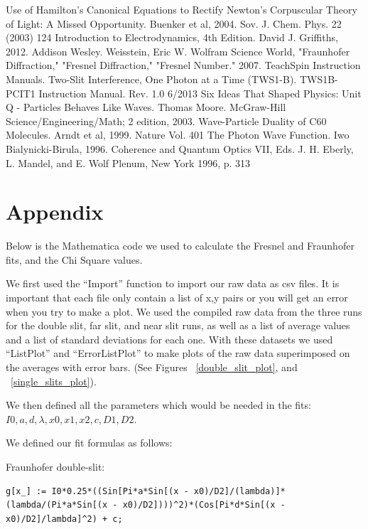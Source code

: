 \documentclass[prb,preprint]{revtex4-1}
\begin{document}
\begin{thebibliography}{3}
 Use of Hamilton's Canonical Equations to Rectify Newton's Corpuscular Theory of Light:  A Missed Opportunity.  Buenker et al, 2004.  Sov. J. Chem. Phys. 22 (2003) 124
 Introduction to Electrodynamics, 4th Edition.  David J. Griffiths, 2012.  Addison Wesley.
Weisstein, Eric W. Wolfram Science World, "Fraunhofer Diffraction," "Fresnel Diffraction," "Fresnel Number." 2007. 
 TeachSpin Instruction Manuals.  Two-Slit Interference, One Photon at a Time (TWS1-B).  TWS1B-PCIT1 Instruction Manual. Rev. 1.0 6/2013
 Six Ideas That Shaped Physics: Unit Q - Particles Behaves Like Waves.  Thomas Moore.  McGraw-Hill Science/Engineering/Math; 2 edition, 2003.
 Wave-Particle Duality of C60 Molecules.  Arndt et al, 1999.  Nature Vol. 401
The Photon Wave Function.  Iwo Bialynicki-Birula, 1996.  Coherence and Quantum Optics VII, Eds. J. H. Eberly, L. Mandel, and E. Wolf
Plenum, New York 1996, p. 313
\end{thebibliography}

\section{Appendix}
Below is the Mathematica code we used to calculate the Fresnel and Fraunhofer fits, and the Chi Square values.  

We first used the ``Import'' function to import our raw data as csv files. It is important that each file only contain a list of x,y pairs or you will get an error when you try to make a plot. We used the compiled raw data from the three runs for the double slit, far slit, and near slit runs, as well as a list of average values and a list of standard deviations for each one. With these datasets we used ``ListPlot'' and ``ErrorListPlot'' to make plots of the raw data superimposed on the averages with error bars.  (See Figures ~\ref{double_slit_plot}, and ~\ref{single_slits_plot}).

We then defined all the parameters which would be needed in the fits: $I0, a, d, \lambda, x0,x1, x2,  c, D1, D2$.

We defined our fit formulas as follows:

Fraunhofer double-slit:

\begin{verbatim}
g[x_] := I0*0.25*((Sin[Pi*a*Sin[(x - x0)/D2]/(lambda)]*(lambda/(Pi*a*Sin[(x - x0)/D2])))^2)*(Cos[Pi*d*Sin[(x - x0)/D2]/lambda]^2) + c;
\end{verbatim}
\end{document}
